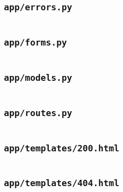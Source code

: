 \subsection{\texttt{app/errors.py}}
\begin{codelisting}
\label{fcl:uswacs-2-iy2d502-salapp:errors.py}
\inputminted[breakanywhere]{python3}{../uswacs-2-iy2d502-salapp/app/errors.py}\end{codelisting}
\subsection{\texttt{app/forms.py}}
\begin{codelisting}
\label{fcl:uswacs-2-iy2d502-salapp:forms.py}
\inputminted[breakanywhere]{python3}{../uswacs-2-iy2d502-salapp/app/forms.py}\end{codelisting}
\subsection{\texttt{app/models.py}}
\begin{codelisting}
\label{fcl:uswacs-2-iy2d502-salapp:models.py}
\inputminted[breakanywhere]{python3}{../uswacs-2-iy2d502-salapp/app/models.py}\end{codelisting}
\subsection{\texttt{app/routes.py}}
\begin{codelisting}
\label{fcl:uswacs-2-iy2d502-salapp:routes.py}
\inputminted[breakanywhere]{python3}{../uswacs-2-iy2d502-salapp/app/routes.py}\end{codelisting}
\subsection{\texttt{app/templates/200.html}}
\begin{codelisting}
\label{fcl:uswacs-2-iy2d502-salapp:200.html}
\inputminted[breakanywhere]{html+jinja}{../uswacs-2-iy2d502-salapp/app/templates/200.html}\end{codelisting}
\subsection{\texttt{app/templates/404.html}}
\begin{codelisting}
\label{fcl:uswacs-2-iy2d502-salapp:404.html}
\inputminted[breakanywhere]{html+jinja}{../uswacs-2-iy2d502-salapp/app/templates/404.html}\end{codelisting}
